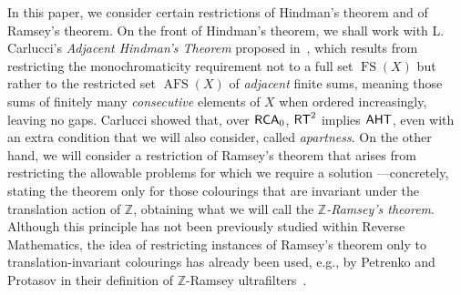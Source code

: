 \documentclass[10pt,a4paper]{amsart}
\newcommand{\rt}{\mathnormal{\mathsf{RT}}}
\newcommand{\aht}{\mathnormal{\mathsf{AHT}}}
\newcommand{\rca}{\mathnormal{\mathsf{RCA}}_0}
\DeclareMathOperator{\afs}{AFS}
\DeclareMathOperator{\fs}{FS}
\theoremstyle{definition}
\begin{document}
In this paper, we consider certain restrictions of Hindman's theorem and of Ramsey's theorem. On the front of Hindman's theorem, we shall work with L. Carlucci's {\it Adjacent Hindman's Theorem} proposed in~\cite{carlucci-adjacent}, which results from restricting the monochromaticity requirement not to a full set $\fs(X)$ but rather to the restricted set $\afs(X)$ of {\it adjacent} finite sums, meaning those sums of finitely many {\it consecutive} elements of $X$ when ordered increasingly, leaving no gaps. Carlucci showed that, over $\rca$, $\rt^2$ implies $\aht$, even with an extra condition that we will also consider, called {\it apartness}. On the other hand, we will consider a restriction of Ramsey's theorem that arises from restricting the allowable problems for which we require a solution ---concretely, stating the theorem only for those colourings that are invariant under the translation action of $\mathbb Z$, obtaining what we will call the {\it $\mathbb Z$-Ramsey's theorem}. Although this principle has not been previously studied within Reverse Mathematics, the idea of restricting instances of Ramsey's theorem only to translation-invariant colourings has already been used, e.g., by Petrenko and Protasov in their definition of $\mathbb Z$-Ramsey ultrafilters~\cite{petrenko-protasov}.
\end{document}
